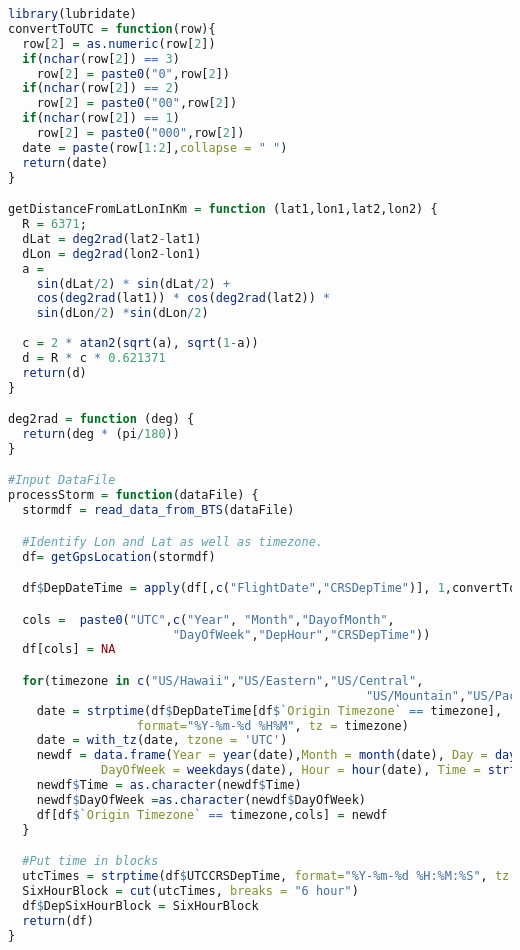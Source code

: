 \documentclass[12pt]{article}
\begin{document}
\begin{lstlisting}[language=R, caption=Data Merging in R]
library(lubridate)
convertToUTC = function(row){
  row[2] = as.numeric(row[2])
  if(nchar(row[2]) == 3)
    row[2] = paste0("0",row[2])
  if(nchar(row[2]) == 2)
    row[2] = paste0("00",row[2])
  if(nchar(row[2]) == 1)
    row[2] = paste0("000",row[2])
  date = paste(row[1:2],collapse = " ")
  return(date)
}

getDistanceFromLatLonInKm = function (lat1,lon1,lat2,lon2) {
  R = 6371;
  dLat = deg2rad(lat2-lat1)
  dLon = deg2rad(lon2-lon1) 
  a = 
    sin(dLat/2) * sin(dLat/2) +
    cos(deg2rad(lat1)) * cos(deg2rad(lat2)) * 
    sin(dLon/2) *sin(dLon/2)
  
  c = 2 * atan2(sqrt(a), sqrt(1-a))
  d = R * c * 0.621371
  return(d)
}

deg2rad = function (deg) {
  return(deg * (pi/180))
}

#Input DataFile
processStorm = function(dataFile) {
  stormdf = read_data_from_BTS(dataFile)

  #Identify Lon and Lat as well as timezone.
  df= getGpsLocation(stormdf)

  df$DepDateTime = apply(df[,c("FlightDate","CRSDepTime")], 1,convertToUTC)

  cols =  paste0("UTC",c("Year", "Month","DayofMonth",
                       "DayOfWeek","DepHour","CRSDepTime"))
  df[cols] = NA

  for(timezone in c("US/Hawaii","US/Eastern","US/Central",
                                                  "US/Mountain","US/Pacific","US/Alaska")){
    date = strptime(df$DepDateTime[df$`Origin Timezone` == timezone], 
                  format="%Y-%m-%d %H%M", tz = timezone)
    date = with_tz(date, tzone = 'UTC')
    newdf = data.frame(Year = year(date),Month = month(date), Day = day(date),
             DayOfWeek = weekdays(date), Hour = hour(date), Time = strftime(date, format="%Y-%m-%d %H:%M:%S"))
    newdf$Time = as.character(newdf$Time)
    newdf$DayOfWeek =as.character(newdf$DayOfWeek)
    df[df$`Origin Timezone` == timezone,cols] = newdf
  }

  #Put time in blocks
  utcTimes = strptime(df$UTCCRSDepTime, format="%Y-%m-%d %H:%M:%S", tz = 'UTC')
  SixHourBlock = cut(utcTimes, breaks = "6 hour")
  df$DepSixHourBlock = SixHourBlock 
  return(df)
}
\end{lstlisting}
\lstlistoflistings
\end{document}
